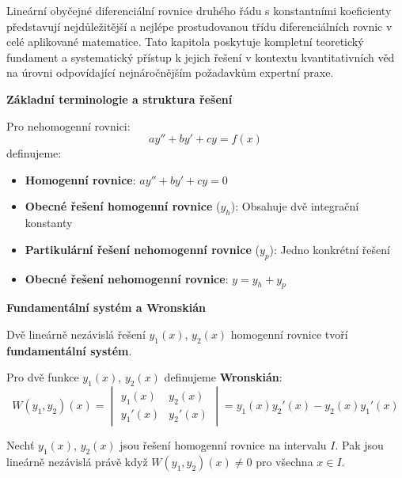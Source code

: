 Lineární obyčejné diferenciální rovnice druhého řádu s konstantními koeficienty představují nejdůležitější a nejlépe prostudovanou třídu diferenciálních rovnic v celé aplikované matematice. Tato kapitola poskytuje kompletní teoretický fundament a systematický přístup k jejich řešení v kontextu kvantitativních věd na úrovni odpovídající nejnáročnějším požadavkům expertní praxe.

\vspace{1\baselineskip}

\noindent\textbf{Základní terminologie a struktura řešení}

Pro nehomogenní rovnici:
\[
ay'' + by' + cy = f(x)
\]
definujeme:

\begin{itemize}
\item \textbf{Homogenní rovnice}: $ay'' + by' + cy = 0$
\item \textbf{Obecné řešení homogenní rovnice} ($y_h$): Obsahuje dvě integrační konstanty
\item \textbf{Partikulární řešení nehomogenní rovnice} ($y_p$): Jedno konkrétní řešení
\item \textbf{Obecné řešení nehomogenní rovnice}: $y = y_h + y_p$
\end{itemize}

\vspace{1\baselineskip}

\noindent\textbf{Fundamentální systém a Wronskián}

\begin{definition}
Dvě lineárně nezávislá řešení $y_1(x)$, $y_2(x)$ homogenní rovnice tvoří \textbf{fundamentální systém}.
\end{definition}

\begin{definition}[Wronskián]
Pro dvě funkce $y_1(x)$, $y_2(x)$ definujeme \textbf{Wronskián}:
\[
W(y_1, y_2)(x) = \begin{vmatrix}
y_1(x) & y_2(x) \\
y_1'(x) & y_2'(x)
\end{vmatrix} = y_1(x)y_2'(x) - y_2(x)y_1'(x)
\]
\end{definition}

\begin{theorem}
Nechť $y_1(x)$, $y_2(x)$ jsou řešení homogenní rovnice na intervalu $I$. Pak jsou lineárně nezávislá právě když $W(y_1, y_2)(x) \neq 0$ pro všechna $x \in I$.
\end{theorem}

